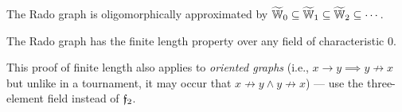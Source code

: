 \begin{theorem}
    The Rado graph is oligomorphically approximated by $\widetilde {\mathbb{W}}_0 \subseteq \widetilde {\mathbb{W}}_1 \subseteq \widetilde {\mathbb{W}}_2 \subseteq \cdots$.
\end{theorem}

\begin{corollary}
    The Rado graph has the finite length property over any field of characteristic $0$.
\end{corollary}

This proof of finite length also applies to \emph{oriented graphs} (i.e., $x \to y \implies y \not\to x$ but unlike in a tournament, it may occur that $x \not\to y \wedge y \not\to x$)
--- use the three-element field instead of $\mathfrak{f}_2$.